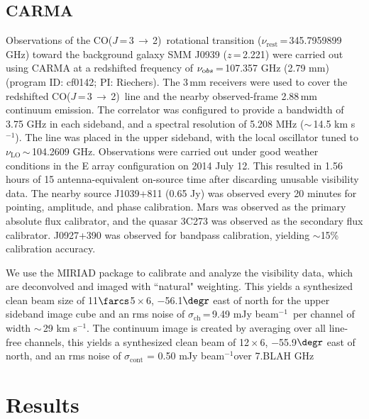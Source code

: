 \documentclass[twocolumn,apj,numberedappendix]{emulateapj}
\newcommand{\CO}{\mbox{CO($J$\,=\,3\,$\rightarrow$\,2) }}
\newcommand{\pmOne}{\mbox{$^{-1}$}}
\begin{document}
\subsection{CARMA} \label{sec:carmadata}
Observations of the \CO rotational transition ($\nu_\textrm{rest}$\,=\,345.7959899 GHz) toward the background galaxy SMM
J0939 ($z$\,=\,2.221) were carried out using CARMA at a redshifted frequency of $\nu_{\textrm obs}$\,=\,107.357\,\,GHz (2.79\,\,mm)  (program ID: cf0142; PI: Riechers). The 3\,mm receivers were used to cover the redshifted \CO line and the nearby observed-frame 2.88\,mm continuum emission. The correlator was configured to provide a bandwidth of 3.75 GHz in each sideband, and a spectral resolution of 5.208 MHz ($\sim$\,14.5 km\,\,s\pmOne). The line was placed in the
upper sideband, with the local oscillator tuned to $\nu_\textrm{LO}$\,$\sim$\,104.2609 GHz. %
Observations were carried out under good
weather conditions in the E array configuration on 2014 July 12. This resulted in 1.56 hours of 15 antenna-equivalent on-source time after discarding unusable visibility data.
The nearby source J1039+811 (0.65\,\,Jy) was observed every 20 minutes for
pointing, amplitude, and phase calibration. Mars was observed as the primary
absolute flux calibrator, and the quasar 3C273 was observed as the secondary
flux calibrator. J0927+390 was observed for bandpass calibration, yielding $\sim
$15\% calibration accuracy. \par
We use the {\sc MIRIAD} package to calibrate and analyze the visibility data, which are deconvolved and imaged with ``natural" weighting.
This yields a synthesized clean beam size of 11$\farcs$5\,$\times$\,6, $-$56.1$\degr$ east of north for the upper sideband image cube and an rms noise of $\sigma_\textrm{ch}$\,=\,9.49\,\,mJy\,\,beam\pmOne\ per channel
of width $\sim$\,29 km\,\,s\pmOne.
The continuum image is created by
averaging over all line-free channels, this yields a synthesized clean beam of 12\,$\times$\,6, $-$55.9$\degr$ east of north, and an rms noise of $\sigma_\textrm{cont}$ = 0.50\,\,mJy\,\,beam\pmOne over 7.BLAH GHz

\section{Results}\label{sec:res}
\end{document}
